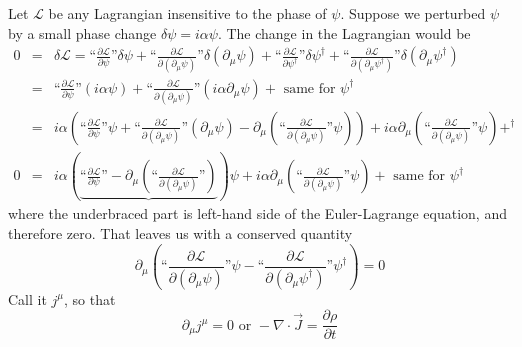 \documentclass[12pt]{article}
\begin{document}
Let $\mathcal{L}$ be any Lagrangian insensitive to the phase of
$\psi$.  Suppose we perturbed $\psi$ by a small phase change $\delta
\psi = i \alpha \psi$.  The change in the Lagrangian would be
\begin{eqnarray}
  0 &=& \delta \mathcal{L} = \mbox{``}\frac{\partial\mathcal{L}}{\partial \psi}\mbox{''} \delta \psi +
  \mbox{``}\frac{\partial\mathcal{L}}{\partial (\partial_\mu \psi)}\mbox{''} \delta (\partial_\mu \psi) +
  \mbox{``}\frac{\partial\mathcal{L}}{\partial \psi^\dagger}\mbox{''} \delta \psi^\dagger +
  \mbox{``}\frac{\partial\mathcal{L}}{\partial (\partial_\mu \psi^\dagger)}\mbox{''} \delta (\partial_\mu \psi^\dagger) \\
  &=& \mbox{``}\frac{\partial\mathcal{L}}{\partial \psi}\mbox{''} (i \alpha \psi) +
  \mbox{``}\frac{\partial\mathcal{L}}{\partial (\partial_\mu \psi)}\mbox{''} (i \alpha \partial_\mu \psi) +
  \mbox{ same for $\psi^\dagger$} \\
  &=& i \alpha \left(\mbox{``}\frac{\partial\mathcal{L}}{\partial \psi}\mbox{''}\psi +
  \mbox{``}\frac{\partial\mathcal{L}}{\partial (\partial_\mu \psi)}\mbox{''} (\partial_\mu \psi) -
  \partial_\mu \left(\mbox{``}\frac{\partial\mathcal{L}}{\partial (\partial_\mu \psi)}\mbox{''} \psi \right) \right)
  + i \alpha \partial_\mu \left(\mbox{``}\frac{\partial\mathcal{L}}{\partial (\partial_\mu \psi)}\mbox{''} \psi \right)
  + ^\dagger \\
  0 &=& i \alpha \left( \underbrace{\mbox{``}\frac{\partial\mathcal{L}}{\partial \psi}\mbox{''} -
  \partial_\mu \left(\mbox{``}\frac{\partial\mathcal{L}}{\partial (\partial_\mu \psi)}\mbox{''}\right)} \right) \psi
  + i \alpha \partial_\mu \left( \mbox{``}\frac{\partial\mathcal{L}}{\partial (\partial_\mu \psi)}\mbox{''} \psi \right)
  + \mbox{ same for $\psi^\dagger$}
\end{eqnarray}
where the underbraced part is left-hand side of the Euler-Lagrange
equation, and therefore zero.  That leaves us with a conserved
quantity
\begin{equation}
  \partial_\mu \left( \mbox{``}\frac{\partial\mathcal{L}}{\partial (\partial_\mu \psi)}\mbox{''} \psi -
  \mbox{``}\frac{\partial\mathcal{L}}{\partial (\partial_\mu \psi^\dagger)}\mbox{''} \psi^\dagger \right) = 0
\end{equation}
Call it $j^\mu$, so that
\begin{equation}
  \partial_\mu j^\mu = 0 \mbox{ or } -\nabla \cdot \vec{J} = \frac{\partial \rho}{\partial t}
\end{equation}
\end{document}

